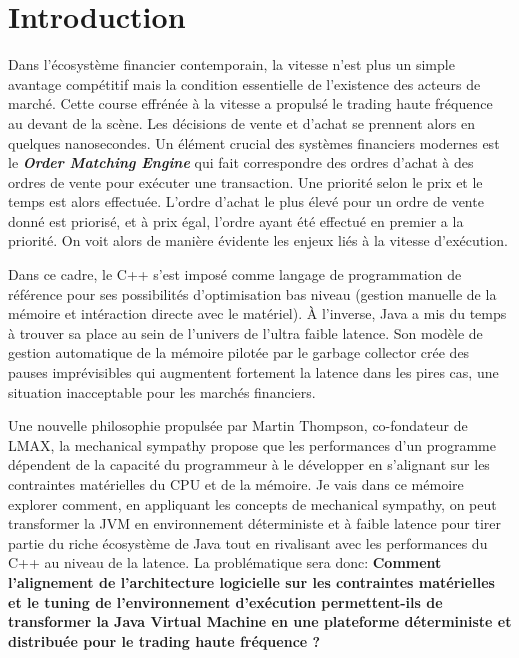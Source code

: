 \clearpage %
\section*{Introduction} %


Dans l'écosystème financier contemporain, la vitesse n'est plus un simple avantage compétitif mais la condition essentielle de l'existence des acteurs de marché. Cette course effrénée à la vitesse a propulsé le trading haute fréquence au devant de la scène. Les décisions de vente et d'achat se prennent alors en quelques nanosecondes. Un élément crucial des systèmes financiers modernes est le \textbf{\textit{Order Matching Engine}} qui fait correspondre des ordres d'achat à des ordres de vente pour exécuter une transaction. Une priorité selon le prix et le temps est alors effectuée. L'ordre d'achat le plus élevé pour un ordre de vente donné est priorisé, et à prix égal, l'ordre ayant été effectué en premier a la priorité. On voit alors de manière évidente les enjeux liés à la vitesse d'exécution.

Dans ce cadre, le C++ s'est imposé comme langage de programmation de référence pour ses possibilités d'optimisation bas niveau (gestion manuelle de la mémoire et intéraction directe avec le matériel). À l'inverse, Java a mis du temps à trouver sa place au sein de l'univers de l'ultra faible latence. Son modèle de gestion automatique de la mémoire pilotée par le garbage collector crée des pauses imprévisibles qui augmentent fortement la latence dans les pires cas, une situation inacceptable pour les marchés financiers.

Une nouvelle philosophie propulsée par Martin Thompson, co-fondateur de LMAX, la mechanical sympathy propose que les performances d'un programme dépendent de la capacité du programmeur à le développer en s'alignant sur les contraintes matérielles du CPU et de la mémoire. Je vais dans ce mémoire explorer comment, en appliquant les concepts de mechanical sympathy, on peut transformer la JVM en environnement déterministe et à faible latence pour tirer partie du riche écosystème de Java tout en rivalisant avec les performances du C++ au niveau de la latence. La problématique sera donc: \textbf{Comment l’alignement de l’architecture logicielle sur les contraintes matérielles et le tuning de l’environnement d’exécution permettent-ils de transformer la Java Virtual Machine en une plateforme déterministe et distribuée pour le trading haute fréquence ?}

